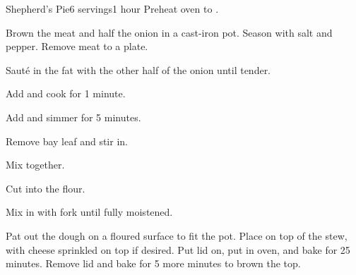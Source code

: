 \documentclass[../Cookbook.tex]{subfiles}
\begin{document}
\begin{recipe}[ShepherdsPie]{Shepherd's Pie}{6 servings}{1 hour}
Preheat oven to .

Brown the meat and half the onion in a cast-iron pot.
Season with salt and pepper.
Remove meat to a plate.

Saut\'e in the fat with the other half of the onion until tender.

Add and cook for 1 minute.

Add and simmer for 5 minutes.

Remove bay leaf and stir in.


Mix together.

Cut into the flour.

Mix in with fork until fully moistened.

Pat out the dough on a floured surface to fit the pot.
Place on top of the stew, with cheese sprinkled on top if desired.
Put lid on, put in oven, and bake for 25 minutes.
Remove lid and bake for 5 more minutes to brown the top.

\end{recipe}
\end{document}
